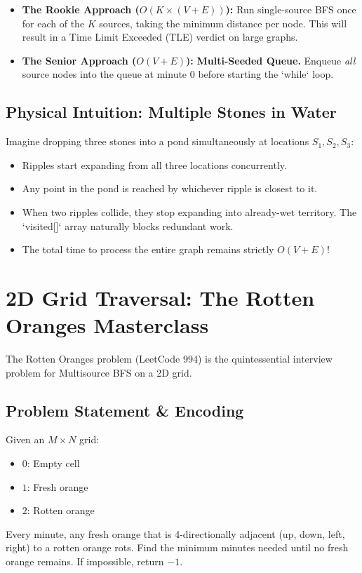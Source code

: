 \documentclass[10pt,journal,compsoc,onecolumn]{IEEEtran}
\begin{document}
\begin{itemize}
    \item \textbf{The Rookie Approach ($O(K \times (V + E))$):} Run single-source BFS once for each of the $K$ sources, taking the minimum distance per node. This will result in a Time Limit Exceeded (TLE) verdict on large graphs.
    \item \textbf{The Senior Approach ($O(V + E)$):} \textbf{Multi-Seeded Queue.} Enqueue \emph{all} source nodes into the queue at minute $0$ before starting the `while` loop.
\end{itemize}

\subsection{Physical Intuition: Multiple Stones in Water}

Imagine dropping three stones into a pond simultaneously at locations $S_1, S_2, S_3$:
\begin{itemize}
    \item Ripples start expanding from all three locations concurrently.
    \item Any point in the pond is reached by whichever ripple is closest to it.
    \item When two ripples collide, they stop expanding into already-wet territory. The `visited[]` array naturally blocks redundant work.
    \item The total time to process the entire graph remains strictly $O(V + E)$!
\end{itemize}

\section{2D Grid Traversal: The Rotten Oranges Masterclass}
\label{sec:rotten_oranges}

The Rotten Oranges problem (LeetCode 994) is the quintessential interview problem for Multisource BFS on a 2D grid.

\subsection{Problem Statement \& Encoding}
Given an $M \times N$ grid:
\begin{itemize}
    \item $0$: Empty cell
    \item $1$: Fresh orange
    \item $2$: Rotten orange
\end{itemize}
Every minute, any fresh orange that is 4-directionally adjacent (up, down, left, right) to a rotten orange rots. Find the minimum minutes needed until no fresh orange remains. If impossible, return $-1$.
\end{document}
